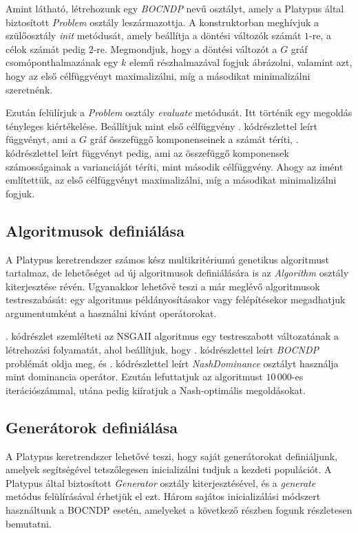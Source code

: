 

Amint látható, létrehozunk egy \emph{BOCNDP} nevű osztályt, amely a Platypus által biztosított \emph{Problem} osztály leszármazottja.
A konstruktorban meghívjuk a szülőosztály \emph{init} metódusát, amely beállítja a döntési változók számát $1$-re, a célok számát pedig $2$-re.
Megmondjuk, hogy a döntési változót a $G$ gráf csomóponthalmazának egy $k$ elemű részhalmazával fogjuk ábrázolni, valamint azt, hogy az első célfüggvényt maximalizálni, míg a másodikat minimalizálni szeretnénk.

Ezután felülírjuk a \emph{Problem} osztály \emph{evaluate} metódusát. Itt történik egy megoldás tényleges kiértékelése.
Beállítjuk mint első célfüggvény . kódrészlettel leírt függvényt, ami a $G$ gráf összefüggő komponenseinek a számát téríti,
. kódrészlettel leírt függvényt pedig, ami az összefüggő komponensek számosságainak a varianciáját téríti, mint második célfüggvény.
Ahogy az imént említettük, az első célfüggvényt maximalizálni, míg a másodikat minimalizálni fogjuk.


\subsection{Algoritmusok definiálása}
A Platypus keretrendszer számos kész multikritériumú genetikus algoritmust tartalmaz, de lehetőséget ad új algoritmusok definiálására is az \emph{Algorithm} osztály kiterjesztése révén.
Ugyanakkor lehetővé teszi a már meglévő algoritmusok testreszabását: egy algoritmus példányosításakor vagy felépítésekor megadhatjuk argumentumként a használni kívánt operátorokat.



. kódrészlet szemlélteti az NSGAII algoritmus egy testreszabott változatának a létrehozási folyamatát,
ahol beállítjuk, hogy . kódrészlettel leírt \emph{BOCNDP} problémát oldja meg, és . kódrészlettel leírt \emph{NashDominance} osztályt használja mint dominancia operátor.
Ezután lefuttatjuk az algoritmust $10\,000$-es iterációszámmal, utána pedig kiíratjuk a Nash-optimális megoldásokat.


\subsection{Generátorok definiálása}
A Platypus keretrendszer lehetővé teszi, hogy saját generátorokat definiáljunk, amelyek segítségével tetszőlegesen inicializálni tudjuk a kezdeti populációt.
A Platypus által biztosított \emph{Generator} osztály kiterjesztésével, és a \emph{generate} metódus felülírásával érhetjük el ezt.
Három sajátos inicializálási módszert használtunk a BOCNDP esetén, amelyeket a következő részben fogunk részletesen bemutatni.
